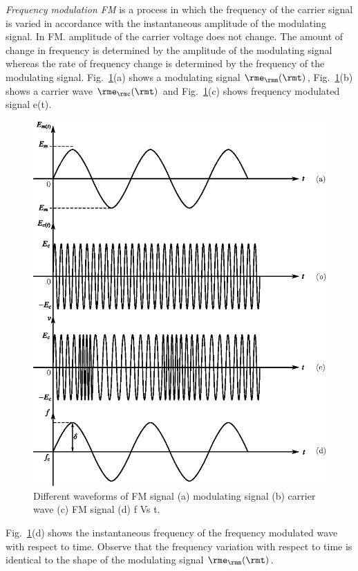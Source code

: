 \textit{Frequency modulation FM} is a process in which the frequency
of the carrier signal is varied in accordance with the instantaneous
amplitude of the modulating signal. In FM. amplitude of the carrier
voltage does not change. The amount  of change in frequency is
determined by the amplitude of the modulating signal whereas the rate
of frequency change is determined by the frequency of the modulating
signal. Fig.~\ref{fig8.8}(a) shows a modulating signal $\rme_\rmm(\rmt)$,
Fig.~\ref{fig8.8}(b) shows a carrier wave $\rme_\rmc(\rmt)$ and
Fig.~\ref{fig8.8}(c) shows frequency modulated signal e(t).
\begin{figure}[H]
\centering
\includegraphics[scale=0.83]{chap8/fig8.6.eps}
\caption{Different waveforms of FM signal (a) modulating signal (b)
carrier wave (c) FM signal (d) f Vs t.}\label{fig8.8}
\end{figure}

Fig.~\ref{fig8.8}(d) shows the instantaneous frequency of the
frequency modulated wave with respect to time. Observe that the
frequency variation with respect to time is identical to the shape of
the modulating signal $\rme_\rmm(\rmt)$.


